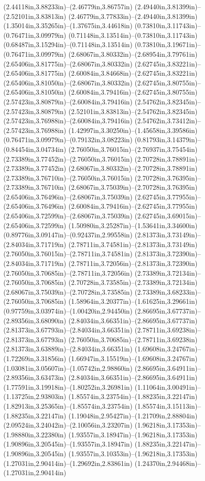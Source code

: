 (2.44118in,3.88233in)--(2.46779in,3.86757in) (2.49440in,3.81399in)--(2.52101in,3.83813in) (2.46779in,3.77833in)--(2.49440in,3.81399in) (1.35014in,3.35265in)--(1.37675in,3.44618in) (0.73810in,3.11743in)--(0.76471in,3.09979in) (0.71148in,3.13514in)--(0.73810in,3.11743in) (0.68487in,3.15294in)--(0.71148in,3.13514in) (0.73810in,3.19671in)--(0.76471in,3.09979in) (2.68067in,3.80332in)--(2.68954in,3.79761in) (2.65406in,3.81775in)--(2.68067in,3.80332in) (2.62745in,3.83221in)--(2.65406in,3.81775in) (2.60084in,3.84668in)--(2.62745in,3.83221in) (2.65406in,3.81050in)--(2.68067in,3.80332in) (2.62745in,3.80755in)--(2.65406in,3.81050in) (2.60084in,3.79416in)--(2.62745in,3.80755in) (2.57423in,3.80879in)--(2.60084in,3.79416in) (2.54762in,3.82345in)--(2.57423in,3.80879in) (2.52101in,3.83813in)--(2.54762in,3.82345in) (2.57423in,3.76988in)--(2.60084in,3.79416in) (2.54762in,3.73412in)--(2.57423in,3.76988in) (1.42997in,3.30250in)--(1.45658in,3.39586in) (0.76471in,3.09979in)--(0.79132in,3.08223in) (0.81793in,3.14379in)--(0.84454in,3.04734in) (2.76050in,3.76015in)--(2.76937in,3.75454in) (2.73389in,3.77452in)--(2.76050in,3.76015in) (2.70728in,3.78891in)--(2.73389in,3.77452in) (2.68067in,3.80332in)--(2.70728in,3.78891in) (2.73389in,3.76710in)--(2.76050in,3.76015in) (2.70728in,3.76395in)--(2.73389in,3.76710in) (2.68067in,3.75039in)--(2.70728in,3.76395in) (2.65406in,3.76496in)--(2.68067in,3.75039in) (2.62745in,3.77955in)--(2.65406in,3.76496in) (2.60084in,3.79416in)--(2.62745in,3.77955in) (2.65406in,3.72599in)--(2.68067in,3.75039in) (2.62745in,3.69015in)--(2.65406in,3.72599in) (1.50980in,3.25287in)--(1.53641in,3.34600in) (0.89776in,3.09147in)--(0.92437in,2.99558in) (2.81373in,3.73149in)--(2.84034in,3.71719in) (2.78711in,3.74581in)--(2.81373in,3.73149in) (2.76050in,3.76015in)--(2.78711in,3.74581in) (2.81373in,3.72390in)--(2.84034in,3.71719in) (2.78711in,3.72056in)--(2.81373in,3.72390in) (2.76050in,3.70685in)--(2.78711in,3.72056in) (2.73389in,3.72134in)--(2.76050in,3.70685in) (2.70728in,3.73585in)--(2.73389in,3.72134in) (2.68067in,3.75039in)--(2.70728in,3.73585in) (2.73389in,3.68233in)--(2.76050in,3.70685in) (1.58964in,3.20377in)--(1.61625in,3.29661in) (0.97759in,3.03974in)--(1.00420in,2.94450in) (2.86695in,3.67737in)--(2.89356in,3.68090in) (2.84034in,3.66351in)--(2.86695in,3.67737in) (2.81373in,3.67793in)--(2.84034in,3.66351in) (2.78711in,3.69238in)--(2.81373in,3.67793in) (2.76050in,3.70685in)--(2.78711in,3.69238in) (2.81373in,3.63889in)--(2.84034in,3.66351in) (1.69608in,3.24767in)--(1.72269in,3.31856in) (1.66947in,3.15519in)--(1.69608in,3.24767in) (1.03081in,3.05607in)--(1.05742in,2.98860in) (2.86695in,3.64911in)--(2.89356in,3.63473in) (2.84034in,3.66351in)--(2.86695in,3.64911in) (1.77591in,3.19918in)--(1.80252in,3.26981in) (1.11064in,3.00491in)--(1.13725in,2.93803in) (1.85574in,3.23754in)--(1.88235in,3.22147in) (1.82913in,3.25365in)--(1.85574in,3.23754in) (1.85574in,3.15113in)--(1.88235in,3.22147in) (1.19048in,2.95427in)--(1.21709in,2.88804in) (2.09524in,3.24042in)--(2.10056in,3.23207in) (1.96218in,3.17353in)--(1.98880in,3.22380in) (1.93557in,3.18947in)--(1.96218in,3.17353in) (1.90896in,3.20545in)--(1.93557in,3.18947in) (1.88235in,3.22147in)--(1.90896in,3.20545in) (1.93557in,3.10353in)--(1.96218in,3.17353in) (1.27031in,2.90414in)--(1.29692in,2.83861in) (1.24370in,2.94468in)--(1.27031in,2.90414in) 